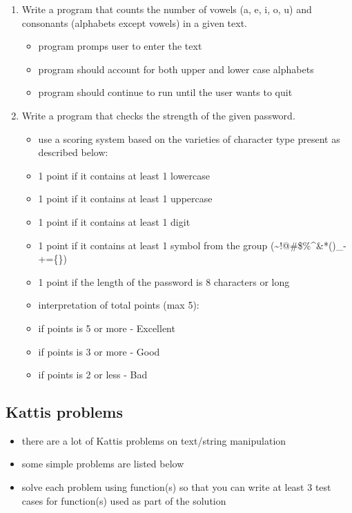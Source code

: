 \documentclass[11pt]{article}
\providecommand{\tightlist}{%
      \setlength{\itemsep}{0pt}\setlength{\parskip}{0pt}}
\begin{document}
    \begin{enumerate}
\def\labelenumi{\arabic{enumi}.}
\setcounter{enumi}{5}
\tightlist
\item
  Write a program that counts the number of vowels (a, e, i, o, u) and
  consonants (alphabets except vowels) in a given text.

  \begin{itemize}
  \tightlist
  \item
    program promps user to enter the text
  \item
    program should account for both upper and lower case alphabets
  \item
    program should continue to run until the user wants to quit
  \end{itemize}
\item
  Write a program that checks the strength of the given password.

  \begin{itemize}
  \tightlist
  \item
    use a scoring system based on the varieties of character type
    present as described below:
  \item
    1 point if it contains at least 1 lowercase
  \item
    1 point if it contains at least 1 uppercase
  \item
    1 point if it contains at least 1 digit
  \item
    1 point if it contains at least 1 symbol from the group
    (\textasciitilde!@\#\$\%\^{}\&*()\_-+=\{\})
  \item
    1 point if the length of the password is 8 characters or long
  \item
    interpretation of total points (max 5):
  \item
    if points is 5 or more - Excellent
  \item
    if points is 3 or more - Good
  \item
    if points is 2 or less - Bad
  \end{itemize}
\end{enumerate}

    \hypertarget{kattis-problems}{%
\subsection{Kattis problems}\label{kattis-problems}}

\begin{itemize}
\tightlist
\item
  there are a lot of Kattis problems on text/string manipulation
\item
  some simple problems are listed below
\item
  solve each problem using function(s) so that you can write at least 3
  test cases for function(s) used as part of the solution
\end{itemize}
\end{document}
